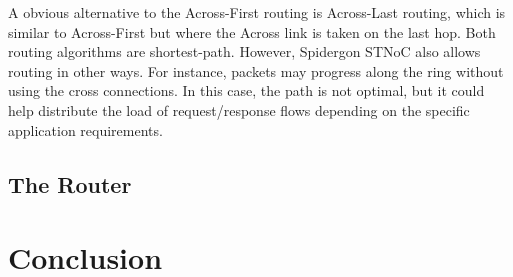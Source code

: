 A obvious alternative to the Across-First routing is Across-Last routing, which is similar to Across-First but where the Across link is taken on the last hop. 
Both routing algorithms are shortest-path. 
However, Spidergon STNoC also allows routing in other ways. 
For instance, packets may progress along the ring without using the cross connections. 
In this case, the path is not optimal, but it could help distribute the load of request/response flows depending on the specific application requirements.

\subsection{The Router}\label{S:router}



\section{Conclusion}\label{S:conclusion}







